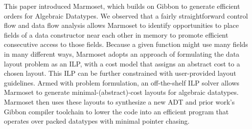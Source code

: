 \documentclass[acmsmall,review,anonymous]{acmart}\settopmatter{printfolios=true,printccs=false,printacmref=false}
\newcommand{\system}{{\sc Marmoset}\xspace}
\begin{document}
This paper introduced \system, which builds on Gibbon to generate efficient orders for Algebraic Datatypes. We observed that a fairly straightforward control flow and data flow analysis allows \system to identify opportunities to place fields of a data constructor near each other in memory to promote efficient consecutive access to those fields. Because a given function might use many fields in many different ways, \system adopts an approach of formulating the data layout problem as an ILP, with a cost model that assigns an abstract cost to a chosen layout. This ILP can be further constrained with user-provided layout guidelines. Armed with problem formulation, an off-the-shelf ILP solver allows \system to generate minimal-(abstract)-cost layouts for algebraic datatypes. \system then uses these layouts to synthesize a new ADT and prior work's Gibbon compiler toolchain to lower the code into an efficient program that operates over packed datatypes with minimal pointer chasing.
\end{document}
